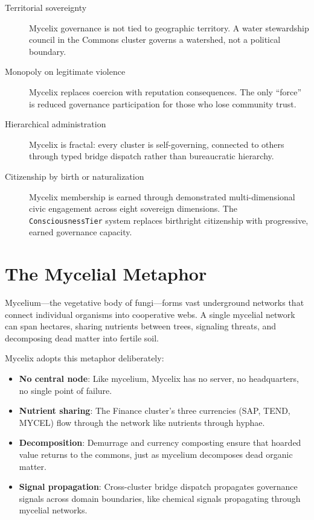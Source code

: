 \documentclass[12pt]{book}
\begin{document}
\begin{description}
  \item[Territorial sovereignty] Mycelix governance is not tied to geographic
    territory. A water stewardship council in the Commons cluster governs a
    watershed, not a political boundary.
  \item[Monopoly on legitimate violence] Mycelix replaces coercion with
    reputation consequences. The only ``force'' is reduced governance
    participation for those who lose community trust.
  \item[Hierarchical administration] Mycelix is fractal: every cluster is
    self-governing, connected to others through typed bridge dispatch rather
    than bureaucratic hierarchy.
  \item[Citizenship by birth or naturalization] Mycelix membership is earned
    through demonstrated multi-dimensional civic engagement across eight sovereign dimensions.
    The \texttt{ConsciousnessTier} system replaces birthright citizenship with
    progressive, earned governance capacity.
\end{description}

\section{The Mycelial Metaphor}

Mycelium---the vegetative body of fungi---forms vast underground networks that
connect individual organisms into cooperative webs. A single mycelial network
can span hectares, sharing nutrients between trees, signaling threats, and
decomposing dead matter into fertile soil.

Mycelix adopts this metaphor deliberately:

\begin{itemize}
  \item \textbf{No central node}: Like mycelium, Mycelix has no server, no
    headquarters, no single point of failure.
  \item \textbf{Nutrient sharing}: The Finance cluster's three currencies
    (SAP, TEND, MYCEL) flow through the network like nutrients through hyphae.
  \item \textbf{Decomposition}: Demurrage and currency composting ensure that
    hoarded value returns to the commons, just as mycelium decomposes dead
    organic matter.
  \item \textbf{Signal propagation}: Cross-cluster bridge dispatch propagates
    governance signals across domain boundaries, like chemical signals propagating
    through mycelial networks.
\end{itemize}
\end{document}
